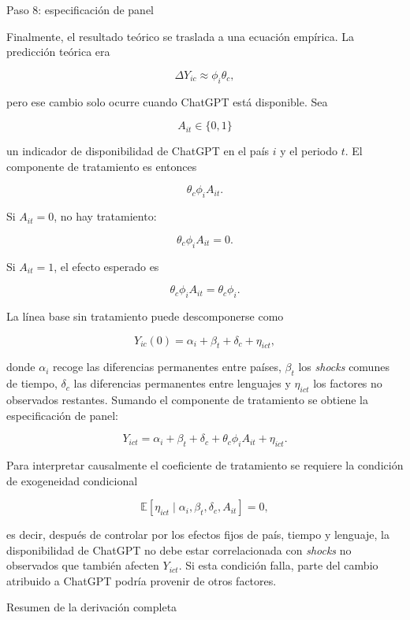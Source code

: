 \documentclass[12pt,a4paper]{article}
\let\textbf\textmd
\begin{document}
\bigskip
\noindent\textbf{Paso 8: especificación de panel}

\medskip
\noindent Finalmente, el resultado teórico se traslada a una ecuación empírica. La predicción teórica era

\[
\Delta Y_{ic}\approx \phi_i\theta_c,
\]

pero ese cambio solo ocurre cuando ChatGPT está disponible. Sea

\[
A_{it}\in\{0,1\}
\]

un indicador de disponibilidad de ChatGPT en el país $i$ y el periodo $t$. El componente de tratamiento es entonces

\[
\theta_c\phi_i A_{it}.
\]

Si $A_{it}=0$, no hay tratamiento:

\[
\theta_c\phi_i A_{it}=0.
\]

Si $A_{it}=1$, el efecto esperado es

\[
\theta_c\phi_i A_{it}=\theta_c\phi_i.
\]

La línea base sin tratamiento puede descomponerse como

\[
Y_{ic}(0)=\alpha_i+\beta_t+\delta_c+\eta_{ict},
\]

donde $\alpha_i$ recoge las diferencias permanentes entre países, $\beta_t$ los \textit{shocks} comunes de tiempo, $\delta_c$ las diferencias permanentes entre lenguajes y $\eta_{ict}$ los factores no observados restantes. Sumando el componente de tratamiento se obtiene la especificación de panel:

\[
Y_{ict}
=
\alpha_i+\beta_t+\delta_c+\theta_c\phi_i A_{it}+\eta_{ict}.
\]

Para interpretar causalmente el coeficiente de tratamiento se requiere la condición de exogeneidad condicional

\[
\mathbb{E}\left[\eta_{ict}\mid \alpha_i,\beta_t,\delta_c,A_{it}\right]=0,
\]

es decir, después de controlar por los efectos fijos de país, tiempo y lenguaje, la disponibilidad de ChatGPT no debe estar correlacionada con \textit{shocks} no observados que también afecten $Y_{ict}$. Si esta condición falla, parte del cambio atribuido a ChatGPT podría provenir de otros factores.

\bigskip
\noindent\textbf{Resumen de la derivación completa}
\end{document}
